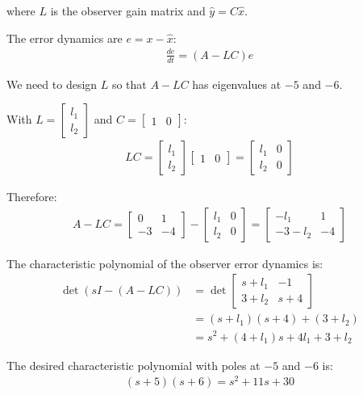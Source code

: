 \documentclass[11pt,a4paper]{article}
\begin{document}
where $L$ is the observer gain matrix and $\hat{y} = C\hat{x}$.

The error dynamics are $e = x - \hat{x}$:
\begin{align}
  \frac{de}{dt} = (A - LC)e
\end{align}

We need to design $L$ so that $A - LC$ has eigenvalues at $-5$ and $-6$.

With $L = \begin{bmatrix} l_1 \\ l_2 \end{bmatrix}$ and $C = \begin{bmatrix} 1 & 0 \end{bmatrix}$:
\begin{align}
  LC = \begin{bmatrix} l_1 \\ l_2 \end{bmatrix}\begin{bmatrix} 1 & 0 \end{bmatrix} = \begin{bmatrix} l_1 & 0 \\ l_2 & 0 \end{bmatrix}
\end{align}

Therefore:
\begin{align}
  A - LC = \begin{bmatrix} 0 & 1 \\ -3 & -4 \end{bmatrix} - \begin{bmatrix} l_1 & 0 \\ l_2 & 0 \end{bmatrix} = \begin{bmatrix} -l_1 & 1 \\ -3-l_2 & -4 \end{bmatrix}
\end{align}

The characteristic polynomial of the observer error dynamics is:
\begin{align}
  \det(sI - (A-LC)) &= \det\begin{bmatrix} s+l_1 & -1 \\ 3+l_2 & s+4 \end{bmatrix} \\
  &= (s+l_1)(s+4) + (3+l_2) \\
  &= s^2 + (4+l_1)s + 4l_1 + 3 + l_2
\end{align}

The desired characteristic polynomial with poles at $-5$ and $-6$ is:
\begin{align}
  (s+5)(s+6) = s^2 + 11s + 30
\end{align}
\end{document}
